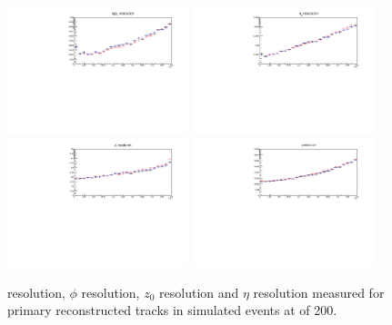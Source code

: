 \begin{figure}[htb]
\centering
\includegraphics[width=0.47\textwidth]{figs/tk-upgrade/results-lowPtTracking/qOverPtResVsInvPtTiltedGeometry_5000.pdf}
\includegraphics[width=0.47\textwidth]{figs/tk-upgrade/results-lowPtTracking/phi0ResVsInvPtTiltedGeometry_5000.pdf}
\\
\includegraphics[width=0.47\textwidth]{figs/tk-upgrade/results-lowPtTracking/z0ResVsInvPtTiltedGeometry_5000.pdf}
\includegraphics[width=0.47\textwidth]{figs/tk-upgrade/results-lowPtTracking/etaResVsInvPtTiltedGeometry_5000.pdf}
\caption{\pt resolution, $\phi$ resolution, $z_{0}$ resolution and $\eta$ resolution measured for primary reconstructed tracks in simulated \ttbar events at \PU of 200.}
\label{fig:kfHelixParametersResVsInvPt}
\end{figure}
